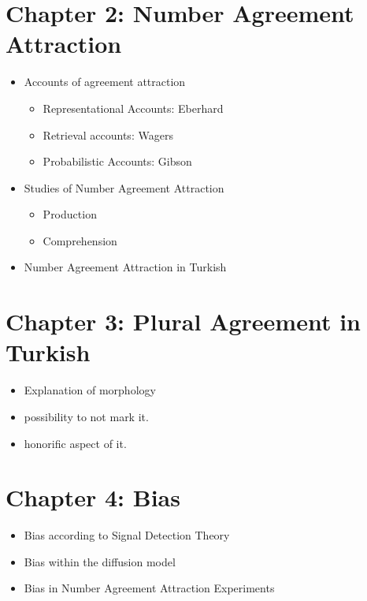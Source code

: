 \documentclass[
  10pt,
  english,
  doc,floatsintext]{apa6}
\providecommand{\tightlist}{%
  \setlength{\itemsep}{0pt}\setlength{\parskip}{0pt}}
\begin{document}
\hypertarget{aa}{%
\section{Chapter 2: Number Agreement Attraction}\label{aa}}

\begin{itemize}
\item
  Accounts of agreement attraction

  \begin{itemize}
  \tightlist
  \item
    Representational Accounts: Eberhard
  \item
    Retrieval accounts: Wagers
  \item
    Probabilistic Accounts: Gibson
  \end{itemize}
\item
  Studies of Number Agreement Attraction

  \begin{itemize}
  \tightlist
  \item
    Production
  \item
    Comprehension
  \end{itemize}
\item
  Number Agreement Attraction in Turkish
\end{itemize}

\hypertarget{chapter-3-plural-agreement-in-turkish}{%
\section{Chapter 3: Plural Agreement in Turkish}\label{chapter-3-plural-agreement-in-turkish}}

\begin{itemize}
\tightlist
\item
  Explanation of morphology
\item
  possibility to not mark it.
\item
  honorific aspect of it.
\end{itemize}

\hypertarget{bias}{%
\section{Chapter 4: Bias}\label{bias}}

\begin{itemize}
\tightlist
\item
  Bias according to Signal Detection Theory
\item
  Bias within the diffusion model
\item
  Bias in Number Agreement Attraction Experiments
\end{itemize}
\end{document}
